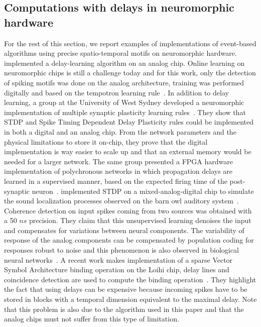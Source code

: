 \documentclass[brainsci, %
               review,submit,pdftex,moreauthors
               ]{Definitions/mdpi}
\begin{document}
\subsection{Computations with delays in neuromorphic hardware}
%
For the rest of this section, we report examples of implementations of event-based algorithms using precise spatio-temporal motifs on neuromorphic hardware. 
\citep{hussain_deltron_2012} implemented a delay-learning algorithm on an analog chip. Online learning on neuromorphic chips is still a challenge today and for this work, only the detection of spiking motifs was done on the analog architecture, training was performed digitally and based on the tempotron learning rule~\citep{gutig_tempotron_2006}. In addition to delay learning, a group at the University of West Sydney developed a neuromorphic implementation of multiple synaptic plasticity learning rules~\citep{wang_neuromorphic_2015}. They show that STDP and Spike Timing Dependent Delay Plasticity rules could be implemented in both a digital and an analog chip. From the network parameters and the physical limitations to store it on-chip, they prove that the digital implementation is way easier to scale up and that an external memory would be needed for a larger network. The same group presented a FPGA hardware implementation of polychronous networks in which propagation delays are learned in a supervised manner, based on the expected firing time of the post-synaptic neuron~\citep{wang_fpga_2014}. %
\citet{pfeil_neuromorphic_2013} implemented STDP on a mixed-analog-digital chip to simulate the sound localization processes observed on the barn owl auditory system~\citep{gerstner_neuronal_1996}. Coherence detection on input spikes coming from two sources was obtained with a 50 $ns$ precision. They claim that this unsupervised learning denoises the input and compensates for variations between neural components. The variability of response of the analog components can be compensated by population coding for responses robust to noise and this phenomenon is also observed in biological neural networks~\citep{boerlin_spike-based_2011}. 
A recent work makes implementation of a sparse Vector Symbol Architecture binding operation on the Loihi chip, delay lines and coincidence detection are used to compute the binding operation~\citep{renner_sparse_2022}. They highlight the fact that using delays can be expensive  because incoming spikes have to be stored in blocks with a temporal dimension equivalent to the maximal delay. Note that this problem is also due to the algorithm used in this paper and that the analog chips must not suffer from this type of limitation. 
\end{document}
